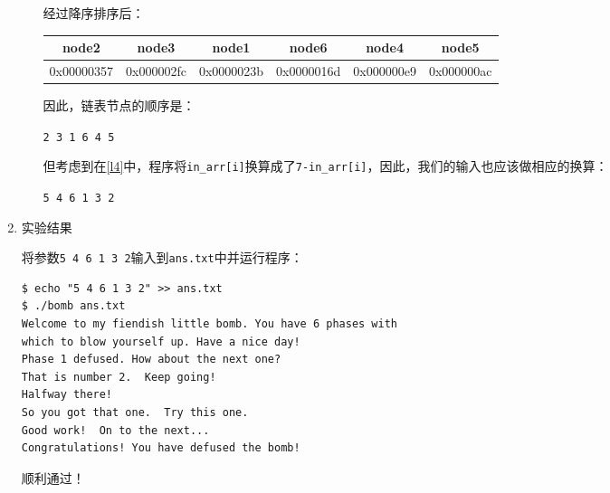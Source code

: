 \documentclass{paper}
\begin{document}
\begin{enumerate}
\begin{enumerate}
经过降序排序后：
\begin{center}
\begin{tabular}{|c|c|c|c|c|c|}
\hline
node2 & node3 & node1 & node6 & node4 & node5 \\
\hline
0x00000357 & 0x000002fc & 0x0000023b & 0x0000016d & 0x000000e9 & 0x000000ac \\
\hline
\end{tabular}
\end{center}

因此，链表节点的顺序是：

\verb|2 3 1 6 4 5|

但考虑到在\ref{l4}中，程序将\verb|in_arr[i]|换算成了\verb|7-in_arr[i]|，因此，我们的输入也应该做相应的换算：

\verb|5 4 6 1 3 2|

\end{enumerate}

\item 实验结果

将参数\verb|5 4 6 1 3 2|输入到\verb|ans.txt|中并运行程序：
\begin{lstlisting}
$ echo "5 4 6 1 3 2" >> ans.txt
$ ./bomb ans.txt
Welcome to my fiendish little bomb. You have 6 phases with
which to blow yourself up. Have a nice day!
Phase 1 defused. How about the next one?
That is number 2.  Keep going!
Halfway there!
So you got that one.  Try this one.
Good work!  On to the next...
Congratulations! You have defused the bomb!
\end{lstlisting}
顺利通过！

\end{enumerate}
\end{document}
